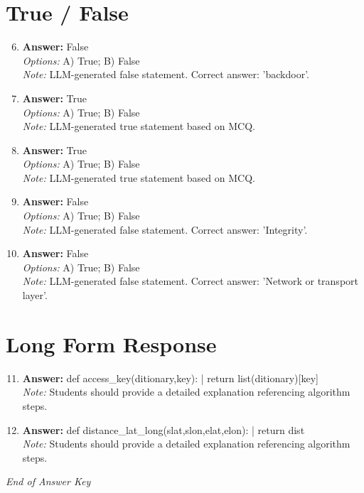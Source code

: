 \documentclass[12pt]{article}
\begin{document}
\section*{True / False}
\begin{enumerate}[label=\arabic*.]
\setcounter{enumi}{5}
\item \textbf{Answer:} False
\\ \textit{Options:} A) True; B) False
\\ \textit{Note:} LLM-generated false statement. Correct answer: 'backdoor'.
\item \textbf{Answer:} True
\\ \textit{Options:} A) True; B) False
\\ \textit{Note:} LLM-generated true statement based on MCQ.
\item \textbf{Answer:} True
\\ \textit{Options:} A) True; B) False
\\ \textit{Note:} LLM-generated true statement based on MCQ.
\item \textbf{Answer:} False
\\ \textit{Options:} A) True; B) False
\\ \textit{Note:} LLM-generated false statement. Correct answer: 'Integrity'.
\item \textbf{Answer:} False
\\ \textit{Options:} A) True; B) False
\\ \textit{Note:} LLM-generated false statement. Correct answer: 'Network or transport layer'.
\end{enumerate}

\section*{Long Form Response}
\begin{enumerate}[label=\arabic*.]
\setcounter{enumi}{10}
\item \textbf{Answer:} def access\_key(ditionary,key): | return list(ditionary)[key]
\\ \textit{Note:} Students should provide a detailed explanation referencing algorithm steps.
\item \textbf{Answer:} def distance\_lat\_long(slat,slon,elat,elon): | return dist
\\ \textit{Note:} Students should provide a detailed explanation referencing algorithm steps.
\end{enumerate}

\vfill
\noindent\textit{End of Answer Key}
\end{document}
